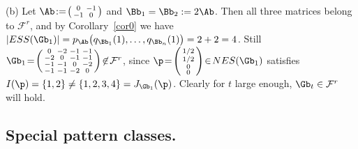 \documentclass[moor]{informs3}              %
\begin{document}
\begin{exa}
{(b) Let $\Ab\!:=\!\left(\begin{smallmatrix}0&-1\\-1&0\end{smallmatrix}\right)$ and $\Bb_1=\Bb_2:=2\Ab$.
Then all three matrices belong to ${\mathcal F}^r$, and by Corollary~\ref{cor0} we have
$|ESS(\Gb_1)|=p_{\Ab}\big(q_{\Bb_1}(1),\ldots,q_{\Bb_n}(1)\big)=2+2=4$.
Still $\Gb_1\!=\!\left(\begin{smallmatrix}0&-2&-1&-1\\-2&0&-1&-1\\-1&-1&0&-2\\-1&-1&-2&0\end{smallmatrix}\right)\!\not\in\!\mathcal{F}^r$, since $\p\!=\!\left(\begin{smallmatrix}1/2\\1/2\\0\\0\end{smallmatrix}\right)\!\in\! NES(\Gb_1)$ satisfies
$I(\p)=\{1,2\}\ne\{1,2,3,4\}=J_{\Gb_1}(\p)$. Clearly for $t$ large enough, $\Gb_t\in\mathcal{F}^r$ will hold.
}
\end{exa}


\subsection{Special pattern classes.}\label{secspec}
\end{document}
